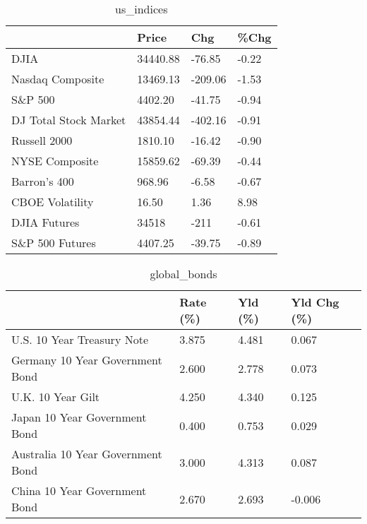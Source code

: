 \documentclass{article}%
\begin{document}
%


\begin{table}[htbp]%
\caption{us\_indices}%
\centering%
\begin{adjustbox}{width=1\textwidth}%
\begin{tabular}{llll}
\toprule
                      &    Price &     Chg &  \%Chg \\
\midrule
                 DJIA & 34440.88 &  -76.85 & -0.22 \\
     Nasdaq Composite & 13469.13 & -209.06 & -1.53 \\
              S\&P 500 &  4402.20 &  -41.75 & -0.94 \\
DJ Total Stock Market & 43854.44 & -402.16 & -0.91 \\
         Russell 2000 &  1810.10 &  -16.42 & -0.90 \\
       NYSE Composite & 15859.62 &  -69.39 & -0.44 \\
         Barron's 400 &   968.96 &   -6.58 & -0.67 \\
      CBOE Volatility &    16.50 &    1.36 &  8.98 \\
         DJIA Futures &    34518 &    -211 & -0.61 \\
      S\&P 500 Futures &  4407.25 &  -39.75 & -0.89 \\
\bottomrule
\end{tabular}
%
\end{adjustbox}%
\end{table}

%


\begin{table}[htbp]%
\caption{global\_bonds}%
\centering%
\begin{adjustbox}{width=1\textwidth}%
\begin{tabular}{llll}
\toprule
                                  & Rate (\%) & Yld (\%) & Yld Chg (\%) \\
\midrule
       U.S. 10 Year Treasury Note &    3.875 &   4.481 &       0.067 \\
  Germany 10 Year Government Bond &    2.600 &   2.778 &       0.073 \\
                U.K. 10 Year Gilt &    4.250 &   4.340 &       0.125 \\
    Japan 10 Year Government Bond &    0.400 &   0.753 &       0.029 \\
Australia 10 Year Government Bond &    3.000 &   4.313 &       0.087 \\
    China 10 Year Government Bond &    2.670 &   2.693 &      -0.006 \\
\bottomrule
\end{tabular}
%
\end{adjustbox}%
\end{table}
\end{document}
